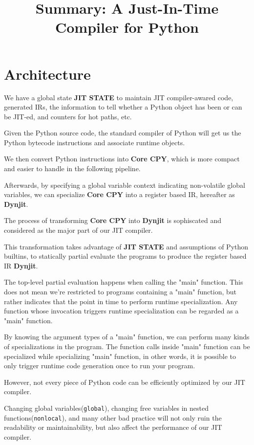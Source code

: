 \documentclass[12pt, a4paper]{report}
\title{Summary: A Just-In-Time Compiler for Python}
\begin{document}
\maketitle

\section*{Architecture}

We have a global state \textbf{JIT STATE} to maintain JIT compiler-awared code,
generated IRs, the information to tell whether a Python object has been or can be JIT-ed,
and counters for hot paths, etc.

Given the Python source code, the standard compiler of Python will get us the Python bytecode
instructions and associate runtime objects. 

We then convert Python instructions into \textbf{Core CPY}, which is more compact and easier to handle in the following pipeline.

Afterwards, by specifying a global variable context indicating non-volatile global variables,
we can specialize \textbf{Core CPY} into a register based IR, hereafter as \textbf{Dynjit}.

The process of transforming \textbf{Core CPY} into \textbf{Dynjit} is sophiscated and considered as the major part of
our JIT compiler.

This transformation takes advantage of \textbf{JIT STATE} and assumptions of Python builtins,
to statically partial evaluate the programs to produce the register based IR \textbf{Dynjit}.

The top-level partial evaluation happens when calling the "main" function. This does not mean we're restricted to
programs containing a "main" function, but rather indicates that the point in time to perform runtime specialization.
Any function whose invocation triggers runtime specialization can be regarded as a "main" function.

By knowing the argument types of a "main" function, we can perform many kinds of specializations in the program.
The function calls inside "main" function can be specialized while specializing "main" function, in other words,
it is possible to only trigger runtime code generation once to run your program.

However, not every piece of Python code can be efficiently optimized by our JIT compiler.

Changing global variables(\lstinline!global!), changing free variables in nested functions(\lstinline!nonlocal!),
and many other bad practice will not only ruin the readability or maintainability, but also affect the performance of our JIT compiler.
\end{document}
